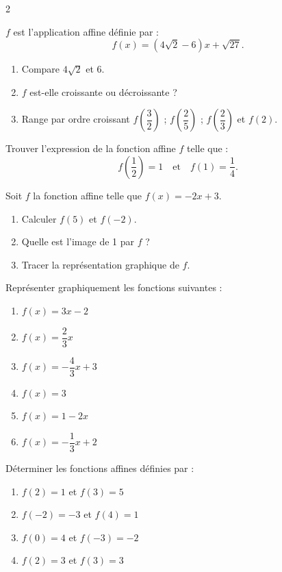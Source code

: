 \begin{multicols*}{2}
 	\begin{center}
 	\end{center}
   $f$ est l'application affine définie par :
  $$f(x) = (4\sqrt{2}-6)x + \sqrt{27}.$$
  \begin{enumerate}
  	\item Compare $4\sqrt{2}$ et 6.
  	\item $f$ est-elle croissante ou décroissante ?
  	\item Range par ordre croissant $f\left(\dfrac{3}{2}\right)$ ; $f\left(\dfrac{2}{5}\right)$ ; $f\left(\dfrac{2}{3}\right)$ et $f(2)$.
  \end{enumerate}
  
   Trouver l'expression de la fonction affine $f$ telle que :
  $$f\left(\frac{1}{2}\right) = 1 \quad \text{et} \quad f(1) = \frac{1}{4}.$$
  
  Soit $f$ la fonction affine telle que $f(x) = -2x+3$.
  \begin{enumerate}
  	\item Calculer $f(5)$ et $f(-2)$.
  	\item Quelle est l'image de 1 par $f$ ?
  	\item Tracer la représentation graphique de $f$.
  \end{enumerate}
  
   Représenter graphiquement les fonctions suivantes :
  \begin{enumerate}
  	\item $f(x) = 3x-2$
  	\item $f(x) = \dfrac{2}{3}x$
  	\item $f(x) = -\dfrac{4}{3}x+3$
  	\item $f(x) = 3$
  	\item $f(x) = 1-2x$
  	\item $f(x) = -\dfrac{1}{3}x+2$
  \end{enumerate}
  
  Déterminer les fonctions affines définies par :
  \begin{enumerate}
  	\item $f(2)=1$ et $f(3)=5$
  	\item $f(-2)=-3$ et $f(4)=1$
  	\item $f(0)=4$ et $f(-3)=-2$
  	\item $f(2)=3$ et $f(3)=3$
  \end{enumerate}
  

\end{multicols*}
